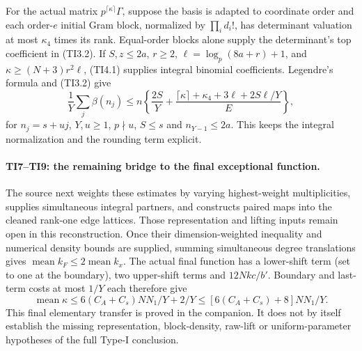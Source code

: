 For the actual matrix $p^{\lceil\kappa\rceil}\Gamma$, suppose the basis is
adapted to coordinate order and each order-$e$ initial Gram block, normalized
by $\prod_i d_i!$, has determinant valuation at most $\kappa_4$ times its rank.
Equal-order blocks alone supply the determinant's top coefficient in (TI3.2).
If $S,z\leq2a$, $r\geq2$, $\ell=\log_p(8a+r)+1$, and
$\kappa\geq(N+3)r^2\ell$, (TI4.1) supplies integral binomial coefficients.
Legendre's formula and (TI3.2) give
\[
 \frac1Y\sum_j\beta(n_j)
 \leq n\left\{\frac{2S}Y+
 \frac{\lceil\kappa\rceil+\kappa_4+3\ell+2S\ell/Y}{E}\right\},
 \tag{TI6.1}
\]
for $n_j=s+uj$, $Y,u\geq1$, $p\nmid u$, $S\leq s$ and $n_{Y-1}\leq2a$.
This keeps the integral normalization and the rounding term explicit.

\paragraph{TI7--TI9: the remaining bridge to the final exceptional function.}
The source next weights these estimates by varying highest-weight
multiplicities, supplies simultaneous integral partners, and constructs
paired maps into the cleaned rank-one edge lattices.
Those representation and lifting inputs remain open in this reconstruction.
Once their dimension-weighted inequality and numerical density bounds are
supplied, summing simultaneous degree translations gives
$\operatorname{mean}k_F\leq2\operatorname{mean}k_x$.
The actual final function has a lower-shift term (set to one at the boundary),
two upper-shift terms and $12Nkc/b'$.  Boundary and last-term costs at most
$1/Y$ each therefore give
\[
 \operatorname{mean}\kappa
 \leq6(C_A+C_s)NN_1/Y+2/Y
 \leq[6(C_A+C_s)+8]NN_1/Y.
 \tag{TI8.1}
\]
This final elementary transfer is proved in the companion.
It does not by itself establish the missing representation, block-density,
raw-lift or uniform-parameter hypotheses of the full Type-I conclusion.
